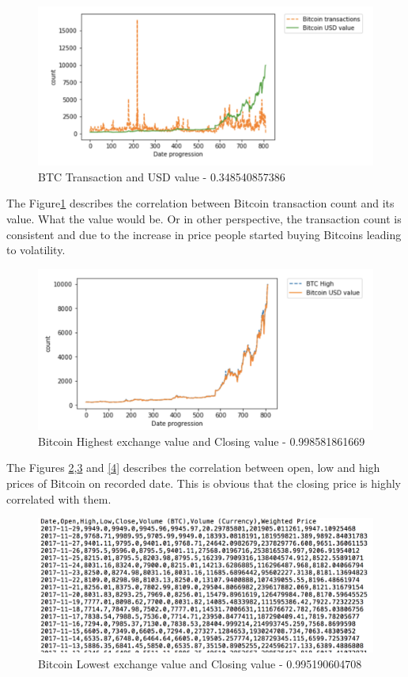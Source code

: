 \documentclass[sigconf]{acmart}
\begin{document}
\begin{figure}[!ht]
  \centering\includegraphics[width=\columnwidth]{PROJECT/images/BTC-prcvsBTC-trans.png}
  \caption{BTC Transaction and USD value - 0.348540857386 }
  \label{1}
\end{figure}

The Figure\ref{1} describes the correlation between Bitcoin transaction count and its value. What the value would be. Or in other perspective, the transaction count is consistent and due to the increase in price people started buying Bitcoins leading to volatility.

\begin{figure}[!ht]
  \centering\includegraphics[width=\columnwidth]{PROJECT/images/High.png}
  \caption{Bitcoin Highest exchange value and Closing value - 0.998581861669  }
  \label{2}
\end{figure}

The Figures \ref{2},\ref{3} and \ref{4} describes the correlation between open, low and high prices of Bitcoin on recorded date. This is obvious that the closing price is highly correlated with them.

\begin{figure}[!ht]
  \centering\includegraphics[width=\columnwidth]{PROJECT/images/Source1data.png}
  \caption{Bitcoin Lowest exchange value and Closing value - 0.995190604708  }
  \label{3}
\end{figure}
\end{document}
